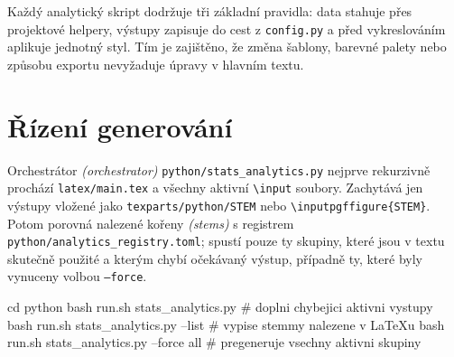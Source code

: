 \documentclass[
  a4paper, 10pt,
  master,
  final,
  notitlepage,
  noheader,
  nofrontmatter,
  noacro,
  nobibliography,
  nosoftware,
  nobackmatter,
  CTUend
]{CTUthesis}
\begin{document}
Každý analytický skript dodržuje tři základní pravidla: data stahuje přes
projektové helpery, výstupy zapisuje do cest z \texttt{config.py} a před
vykreslováním aplikuje jednotný styl. Tím je zajištěno, že změna šablony,
barevné palety nebo způsobu exportu nevyžaduje úpravy v hlavním textu.

\section*{Řízení generování}
Orchestrátor \textit{(orchestrator)} \texttt{python/stats\_analytics.py} nejprve rekurzivně prochází
\texttt{latex/main.tex} a všechny aktivní \texttt{\textbackslash input} soubory.
Zachytává jen výstupy vložené jako \texttt{texparts/python/STEM} nebo
\texttt{\textbackslash inputpgffigure\{STEM\}}. Potom porovná nalezené kořeny \textit{(stems)}
s registrem \texttt{python/analytics\_registry.toml}; spustí pouze ty skupiny,
které jsou v textu skutečně použité a kterým chybí očekávaný výstup, případně
ty, které byly vynuceny volbou \texttt{--force}.

\begin{center}
\end{center}

\begin{pipelinecode}
cd python
bash run.sh stats_analytics.py              # doplni chybejici aktivni vystupy
bash run.sh stats_analytics.py --list       # vypise stemmy nalezene v LaTeXu
bash run.sh stats_analytics.py --force all  # pregeneruje vsechny aktivni skupiny
\end{pipelinecode}
\end{document}
